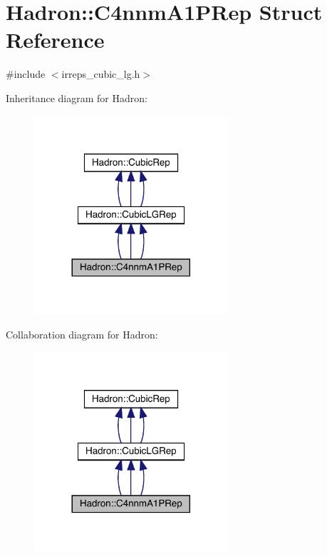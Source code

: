 \hypertarget{structHadron_1_1C4nnmA1PRep}{}\section{Hadron\+:\+:C4nnm\+A1\+P\+Rep Struct Reference}
\label{structHadron_1_1C4nnmA1PRep}


{\ttfamily \#include $<$irreps\+\_\+cubic\+\_\+lg.\+h$>$}



Inheritance diagram for Hadron\+:
\nopagebreak
\begin{figure}[H]
\begin{center}
\leavevmode
\includegraphics[width=204pt]{d8/db4/structHadron_1_1C4nnmA1PRep__inherit__graph}
\end{center}
\end{figure}


Collaboration diagram for Hadron\+:
\nopagebreak
\begin{figure}[H]
\begin{center}
\leavevmode
\includegraphics[width=204pt]{df/d02/structHadron_1_1C4nnmA1PRep__coll__graph}
\end{center}
\end{figure}
